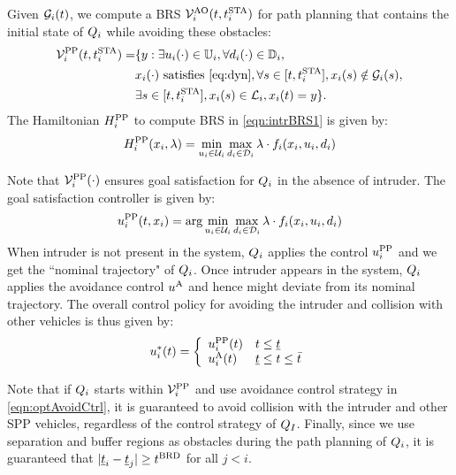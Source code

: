 Given $\mathcal{G}_i(t)$, we compute a BRS $\mathcal{V}^{\text{AO}}_{i}(t, t^\text{STA}_i)$ for path planning that contains the initial state of $Q_i$ while avoiding these obstacles:
\begin{equation} \label{eqn:intrBRS1}
\begin{aligned}
\brs^{\text{PP}}_{i}(t, \sta_i) = & \{y: \exists \ctrl_i(\cdot) \in \cfset_i, \forall \dstb_i(\cdot) \in \dfset_i, \\
& \state_i(\cdot) \text{ satisfies \eqref{eq:dyn}}, \forall s \in [t, \sta_i], \state_i(s) \notin \obsset_i(s), \\
& \exists s \in [t, \sta_i], \state_i(s) \in \targetset_i, \state_i(t) = y \}.
\end{aligned}
\end{equation}
The Hamiltonian $H^{\text{PP}}_{i}$ to compute BRS in \eqref{eqn:intrBRS1} is given by:
\begin{equation} \label{eqn:BRSham}
\ham^{\text{PP}}_{i}(\state_i, \costate) = \min_{\ctrl_i \in \cset_i} \max_{\dstb_i \in \dset_i} \costate \cdot f_i (\state_i, \ctrl_i, \dstb_i)
\end{equation}

Note that $\mathcal{V}^{\text{PP}}_{i}(\cdot)$ ensures goal satisfaction for $Q_i$ in the absence of intruder. The goal satisfaction controller is given by:
\begin{equation} \label{eqn:PPPolicy}
{\ctrl^{\text{PP}}_{i}}(t, \state_i) = \arg \min_{\ctrl_i \in \cset_i} \max_{\dstb_i \in \dset_i} \costate \cdot f_i (\state_i, \ctrl_i, \dstb_i)
\end{equation}
When intruder is not present in the system, $Q_i$ applies the control ${u^{\text{PP}}_{i}}$ and we get the ``nominal trajectory" of $Q_i$. Once intruder appears in the system, $Q_i$ applies the avoidance control ${u^{\text{A}}}$ and hence might deviate from its nominal trajectory. The overall control policy for avoiding the intruder and collision with other vehicles is thus given by:
\begin{equation*}
{u^*_{i}}(t) = 
\left \{ 
\begin{array}{ll}
{u^{\text{PP}}_{i}}(t) & t \leq \underline{t}\\
{u^{\text{A}}_{i}}(t) & \underline{t}\leq t \leq \bar{t}
\end{array}
\right.
\end{equation*}

Note that if $Q_i$ starts within $\mathcal{V}^{\text{PP}}_{i}$ and use avoidance control strategy in \eqref{eqn:optAvoidCtrl}, it is guaranteed to avoid collision with the intruder and other SPP vehicles, regardless of the control strategy of $Q_{I}$. Finally, since we use separation and buffer regions as obstacles during the path planning of $Q_i$, it is guaranteed that $|\underline{t}_i - \underline{t}_j| \geq t^\text{BRD}$ for all $j < i$. 

